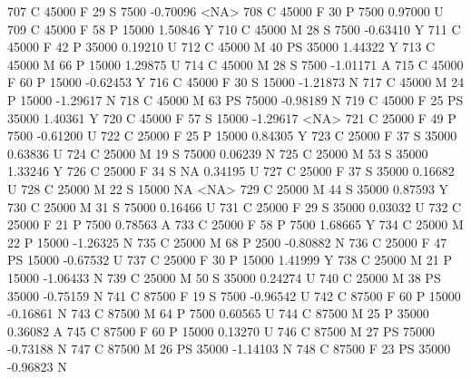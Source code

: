 \documentclass{article}
\begin{document}
\begin{Schunk}
\begin{Soutput}
707       C      45000   F  29         S   7500  -0.70096 <NA>
708       C      45000   F  30         P   7500   0.97000    U
709       C      45000   F  58         P  15000   1.50846    Y
710       C      45000   M  28         S   7500  -0.63410    Y
711       C      45000   F  42         P  35000   0.19210    U
712       C      45000   M  40        PS  35000   1.44322    Y
713       C      45000   M  66         P  15000   1.29875    U
714       C      45000   M  28         S   7500  -1.01171    A
715       C      45000   F  60         P  15000  -0.62453    Y
716       C      45000   F  30         S  15000  -1.21873    N
717       C      45000   M  24         P  15000  -1.29617    N
718       C      45000   M  63        PS  75000  -0.98189    N
719       C      45000   F  25        PS  35000   1.40361    Y
720       C      45000   F  57         S  15000  -1.29617 <NA>
721       C      25000   F  49         P   7500  -0.61200    U
722       C      25000   F  25         P  15000   0.84305    Y
723       C      25000   F  37         S  35000   0.63836    U
724       C      25000   M  19         S  75000   0.06239    N
725       C      25000   M  53         S  35000   1.33246    Y
726       C      25000   F  34         S     NA   0.34195    U
727       C      25000   F  37         S  35000   0.16682    U
728       C      25000   M  22         S  15000        NA <NA>
729       C      25000   M  44         S  35000   0.87593    Y
730       C      25000   M  31         S  75000   0.16466    U
731       C      25000   F  29         S  35000   0.03032    U
732       C      25000   F  21         P   7500   0.78563    A
733       C      25000   F  58         P   7500   1.68665    Y
734       C      25000   M  22         P  15000  -1.26325    N
735       C      25000   M  68         P   2500  -0.80882    N
736       C      25000   F  47        PS  15000  -0.67532    U
737       C      25000   F  30         P  15000   1.41999    Y
738       C      25000   M  21         P  15000  -1.06433    N
739       C      25000   M  50         S  35000   0.24274    U
740       C      25000   M  38        PS  35000  -0.75159    N
741       C      87500   F  19         S   7500  -0.96542    U
742       C      87500   F  60         P  15000  -0.16861    N
743       C      87500   M  64         P   7500   0.60565    U
744       C      87500   M  25         P  35000   0.36082    A
745       C      87500   F  60         P  15000   0.13270    U
746       C      87500   M  27        PS  75000  -0.73188    N
747       C      87500   M  26        PS  35000  -1.14103    N
748       C      87500   F  23        PS  35000  -0.96823    N

\end{Soutput}
\end{Schunk}
\end{document}
